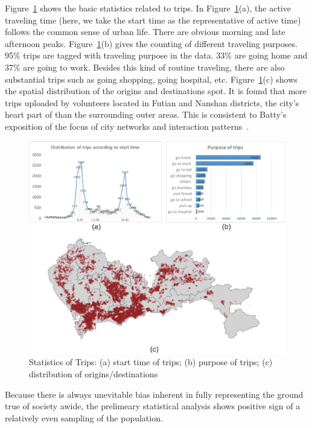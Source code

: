Figure~\ref{fig:data_geometry} shows the basic statistics related to trips. In Figure~\ref{fig:data_geometry}(a), the active traveling time (here, we take the start time as the representative of active time) follows the common sense of urban life. There are obvious morning and late afternoon peaks. Figure~\ref{fig:data_geometry}(b) gives the counting of different traveling purposes. 95\% trips are tagged with traveling purpose in the data. 33\% are going home and 37\% are going to work. Besides this kind of routine traveling, there are also substantial trips such as going shopping, going hospital, etc. Figure~\ref{fig:data_geometry}(c) shows the spatial distribution of the origins and destinations spot. It is found that more trips uploaded by volunteers located in Futian and Nanshan districts, the city's heart part of than the surrounding outer areas. This is consistent to Batty's exposition of the focus of city networks and interaction patterns~\cite{batty2013new}. 


\begin{figure}[htb!]
 \centering %
 \includegraphics[width=\columnwidth]{pictures/data3}
 \caption{Statistics of Trips: (a) start time of trips; (b) purpose of trips; (c) distribution of origins/destinations }
 \label{fig:data_geometry}
\end{figure}

Because there is always unevitable bias inherent in fully representing the ground true of society awide, the prelimeary statistical analysis shows positive sign of a relatively even sampling of the population. 
